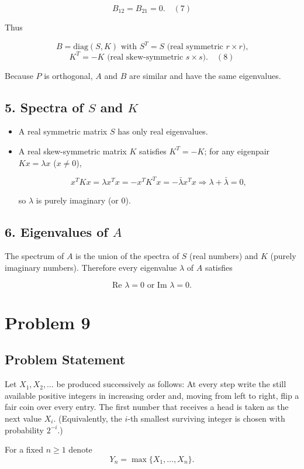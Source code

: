 \documentclass[12pt,a4paper]{article}
\theoremstyle{definition}
\begin{document}
$$B_{12}=B_{21}=0.\quad(7)$$

Thus

$$B = \text{diag}(S , K)\text{ with }S^T=S\text{ (real symmetric }r\times r\text{),}$$
$$K^T=-K\text{ (real skew-symmetric }s\times s\text{).}\quad(8)$$

Because $P$ is orthogonal, $A$ and $B$ are similar and have the same eigenvalues.

\subsection*{5. Spectra of $S$ and $K$}
\begin{itemize}
\item A real symmetric matrix $S$ has only real eigenvalues.
\item A real skew-symmetric matrix $K$ satisfies $K^T = -K$; for any eigenpair $Kx = \lambda x$ ($x \neq 0$),

$$x^TKx = \lambda x^Tx = -x^TK^Tx = -\bar{\lambda} x^Tx \Rightarrow \lambda+ \bar{\lambda} = 0,$$

so $\lambda$ is purely imaginary (or 0).
\end{itemize}

\subsection*{6. Eigenvalues of $A$}
The spectrum of $A$ is the union of the spectra of $S$ (real numbers) and $K$ (purely imaginary numbers). Therefore every eigenvalue $\lambda$ of $A$ satisfies

$$\text{Re } \lambda = 0\text{ or }\text{Im } \lambda = 0.$$

\section{Problem 9}
\subsection*{Problem Statement}

Let $X_1, X_2, \ldots$ be produced successively as follows:
At every step write the still available positive integers in increasing order and, moving from left to right, flip a fair coin over every entry. The first number that receives a head is taken as the next value $X_i$. (Equivalently, the $i$-th smallest surviving integer is chosen with probability $2^{-i}$.)

For a fixed $n \geq 1$ denote
\[
Y_n = \max\{X_1, \ldots, X_n\}.
\]
\end{document}
